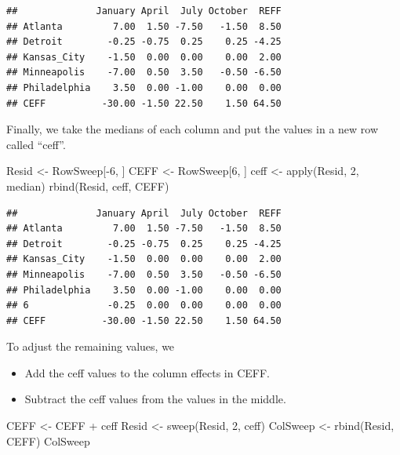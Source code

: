 \documentclass[
]{book}
\newenvironment{Shaded}{\begin{snugshade}}{\end{snugshade}}
\newcommand{\DecValTok}[1]{\textcolor[rgb]{0.00,0.00,0.81}{#1}}
\newcommand{\FunctionTok}[1]{\textcolor[rgb]{0.00,0.00,0.00}{#1}}
\newcommand{\NormalTok}[1]{#1}
\newcommand{\OtherTok}[1]{\textcolor[rgb]{0.56,0.35,0.01}{#1}}
\newcommand{\SpecialCharTok}[1]{\textcolor[rgb]{0.00,0.00,0.00}{#1}}
\providecommand{\tightlist}{%
  \setlength{\itemsep}{0pt}\setlength{\parskip}{0pt}}
\begin{document}
\begin{verbatim}
##              January April  July October  REFF
## Atlanta         7.00  1.50 -7.50   -1.50  8.50
## Detroit        -0.25 -0.75  0.25    0.25 -4.25
## Kansas_City    -1.50  0.00  0.00    0.00  2.00
## Minneapolis    -7.00  0.50  3.50   -0.50 -6.50
## Philadelphia    3.50  0.00 -1.00    0.00  0.00
## CEFF          -30.00 -1.50 22.50    1.50 64.50
\end{verbatim}

Finally, we take the medians of each column and put the values in a new row called ``ceff''.

\begin{Shaded}
\begin{Highlighting}[]
\NormalTok{Resid }\OtherTok{\textless{}{-}}\NormalTok{ RowSweep[}\SpecialCharTok{{-}}\DecValTok{6}\NormalTok{, ]}
\NormalTok{CEFF }\OtherTok{\textless{}{-}}\NormalTok{ RowSweep[}\DecValTok{6}\NormalTok{, ]}
\NormalTok{ceff }\OtherTok{\textless{}{-}} \FunctionTok{apply}\NormalTok{(Resid, }\DecValTok{2}\NormalTok{, median)}
\FunctionTok{rbind}\NormalTok{(Resid, ceff, CEFF)}
\end{Highlighting}
\end{Shaded}

\begin{verbatim}
##              January April  July October  REFF
## Atlanta         7.00  1.50 -7.50   -1.50  8.50
## Detroit        -0.25 -0.75  0.25    0.25 -4.25
## Kansas_City    -1.50  0.00  0.00    0.00  2.00
## Minneapolis    -7.00  0.50  3.50   -0.50 -6.50
## Philadelphia    3.50  0.00 -1.00    0.00  0.00
## 6              -0.25  0.00  0.00    0.00  0.00
## CEFF          -30.00 -1.50 22.50    1.50 64.50
\end{verbatim}

To adjust the remaining values, we

\begin{itemize}
\tightlist
\item
  Add the ceff values to the column effects in CEFF.
\item
  Subtract the ceff values from the values in the middle.
\end{itemize}

\begin{Shaded}
\begin{Highlighting}[]
\NormalTok{CEFF }\OtherTok{\textless{}{-}}\NormalTok{ CEFF }\SpecialCharTok{+}\NormalTok{ ceff}
\NormalTok{Resid }\OtherTok{\textless{}{-}} \FunctionTok{sweep}\NormalTok{(Resid, }\DecValTok{2}\NormalTok{, ceff)}
\NormalTok{ColSweep }\OtherTok{\textless{}{-}} \FunctionTok{rbind}\NormalTok{(Resid, CEFF)}
\NormalTok{ColSweep}
\end{Highlighting}
\end{Shaded}
\end{document}
